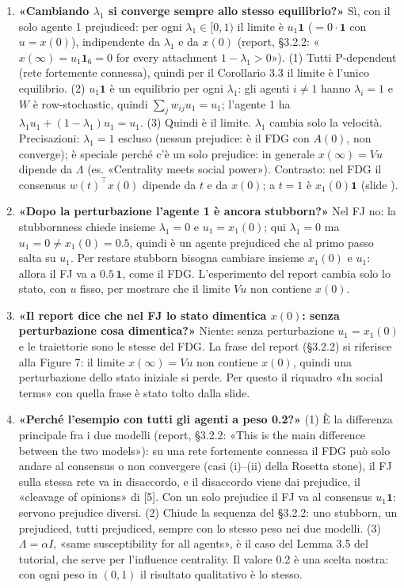 \documentclass[a4paper,10pt]{article}
\newcommand{\fr}[1]{\getrefnumber{P-#1}}      %
\newcommand{\uno}{\mathbf{1}}
\begin{document}
\begin{enumerate}[leftmargin=1.6em,itemsep=3pt]
  \item \textbf{«Cambiando $\lambda_1$ si converge sempre allo stesso equilibrio?»} Sì, con il solo agente 1 prejudiced: per ogni $\lambda_1\in[0,1)$ il limite è $u_1\uno$ ($=0\cdot\uno$ con $u=x(0)$), indipendente da $\lambda_1$ e da $x(0)$ (report, §3.2.2: «$x(\infty)=u_1\mathbf 1_6=0$ for every attachment $1-\lambda_1>0$»). (1) Tutti P-dependent (rete fortemente connessa), quindi per il Corollario 3.3 il limite è l'unico equilibrio. (2) $u_1\uno$ è un equilibrio per ogni $\lambda_1$: gli agenti $i\neq1$ hanno $\lambda_i=1$ e $W$ è row-stochastic, quindi $\sum_j w_{ij}u_1=u_1$; l'agente 1 ha $\lambda_1u_1+(1-\lambda_1)u_1=u_1$. (3) Quindi è il limite. $\lambda_1$ cambia solo la velocità. Precisazioni: $\lambda_1=1$ escluso (nessun prejudice: è il FDG con $A(0)$, non converge); è speciale perché c'è un solo prejudice: in generale $x(\infty)=Vu$ dipende da $\Lambda$ (es. «Centrality meets social power»). Contrasto: nel FDG il consensus $w(t)^\top x(0)$ dipende da $t$ e da $x(0)$; a $t=1$ è $x_1(0)\uno$ (slide \fr{m-state-input}).
  \item \textbf{«Dopo la perturbazione l'agente 1 è ancora stubborn?»} Nel FJ no: la stubbornness chiede insieme $\lambda_1=0$ e $u_1=x_1(0)$; qui $\lambda_1=0$ ma $u_1=0\neq x_1(0)=0.5$, quindi è un agente prejudiced che al primo passo salta su $u_1$. Per restare stubborn bisogna cambiare insieme $x_1(0)$ e $u_1$: allora il FJ va a $0.5\,\uno$, come il FDG. L'esperimento del report cambia solo lo stato, con $u$ fisso, per mostrare che il limite $Vu$ non contiene $x(0)$.
  \item \textbf{«Il report dice che nel FJ lo stato dimentica $x(0)$: senza perturbazione cosa dimentica?»} Niente: senza perturbazione $u_1=x_1(0)$ e le traiettorie sono le stesse del FDG. La frase del report (§3.2.2) si riferisce alla Figure 7: il limite $x(\infty)=Vu$ non contiene $x(0)$, quindi una perturbazione dello stato iniziale si perde. Per questo il riquadro «In social terms» con quella frase è stato tolto dalla slide.
  \item \textbf{«Perché l'esempio con tutti gli agenti a peso 0.2?»} (1) È la differenza principale fra i due modelli (report, §3.2.2: «This is the main difference between the two models»): su una rete fortemente connessa il FDG può solo andare al consensus o non convergere (casi (i)–(ii) della Rosetta stone), il FJ sulla stessa rete va in disaccordo, e il disaccordo viene dai prejudice, il «cleavage of opinions» di [5]. Con un solo prejudice il FJ va al consensus $u_1\uno$: servono prejudice diversi. (2) Chiude la sequenza del §3.2.2: uno stubborn, un prejudiced, tutti prejudiced, sempre con lo stesso peso nei due modelli. (3) $\Lambda=\alpha I$, «same susceptibility for all agents», è il caso del Lemma 3.5 del tutorial, che serve per l'influence centrality. Il valore 0.2 è una scelta nostra: con ogni peso in $(0,1)$ il risultato qualitativo è lo stesso.

\end{enumerate}
\end{document}
